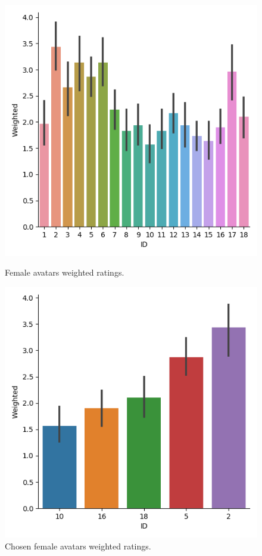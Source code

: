 \begin{figure}[H]
\hspace*{\fill}
\centering
\captionsetup{justification=centering,margin=0.1cm}
  \begin{minipage}[b]{0.4\textwidth}
    \includegraphics[width=\textwidth]{Survey/weighted_ratings_female_survey.png}
    \caption{Female avatars weighted ratings.}
     \label{fig:SurveyRatedFemalesAll}
    \end{minipage}
\hfill
  \begin{minipage}[b]{0.4\textwidth}
    \includegraphics[width=\textwidth]{Survey/weighted_ratings_female_survey_chosen.png}
    \caption{Chosen female avatars weighted ratings.}
     \label{fig:SurveyRatedFemalesChosen}
  \end{minipage}
\hspace*{\fill}
\end{figure}
